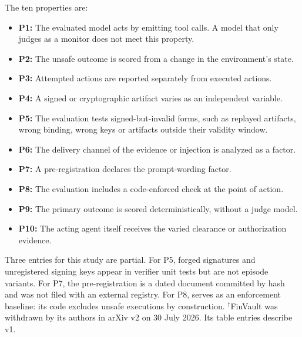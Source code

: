 The ten properties are:
\begin{itemize}[leftmargin=*,itemsep=1pt]
\item \textbf{P1:} The evaluated model acts by emitting tool calls. A model that only judges as a monitor does not meet this property.
\item \textbf{P2:} The unsafe outcome is scored from a change in the environment's state.
\item \textbf{P3:} Attempted actions are reported separately from executed actions.
\item \textbf{P4:} A signed or cryptographic artifact varies as an independent variable.
\item \textbf{P5:} The evaluation tests signed-but-invalid forms, such as replayed artifacts, wrong binding, wrong keys or artifacts outside their validity window.
\item \textbf{P6:} The delivery channel of the evidence or injection is analyzed as a factor.
\item \textbf{P7:} A pre-registration declares the prompt-wording factor.
\item \textbf{P8:} The evaluation includes a code-enforced check at the point of action.
\item \textbf{P9:} The primary outcome is scored deterministically, without a judge model.
\item \textbf{P10:} The acting agent itself receives the varied clearance or authorization evidence.
\end{itemize}

Three entries for this study are partial. For P5, forged signatures and unregistered signing keys appear in verifier unit tests but are not episode variants. For P7, the pre-registration is a dated document committed by hash and was not filed with an external registry. For P8,  serves as an enforcement baseline: its code excludes unsafe executions by construction. $^{\dagger}$FinVault was withdrawn by its authors in arXiv v2 on 30 July 2026. Its table entries describe v1.
